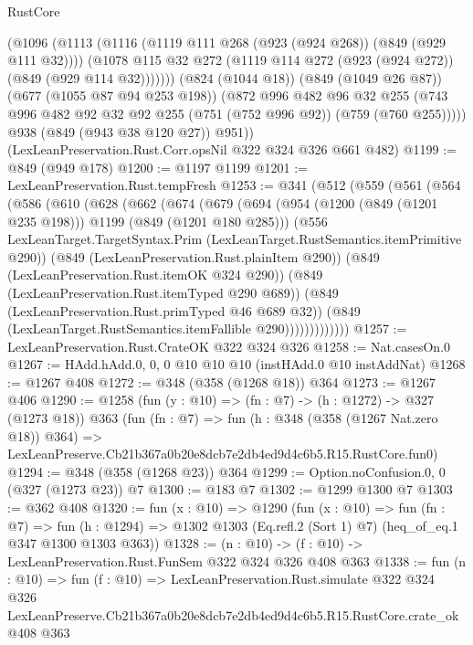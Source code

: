 \begin{lexlean}{RustCore}
\begin{coremodule}
            (@1096
              (@1113
                (@1116 (@1119 @111 @268 (@923 (@924 @268)) (@849 (@929 @111 @32))))
                (@1078 @115 @32 @272 (@1119 @114 @272 (@923 (@924 @272)) (@849 (@929 @114 @32)))))))
          (@824 (@1044 @18))
          (@849 (@1049 @26 @87))
          (@677 (@1055 @87 @94 @253 @198))
          (@872
            @996
            @482
            @96
            @32
            @255
            (@743 @996 @482 @92 @32 @92 @255 (@751 (@752 @996 @92)) (@759 (@760 @255)))))
        @938
        (@849 (@943 @38 @120 @27))
        @951))
    (LexLeanPreservation.Rust.Corr.opsNil @322 @324 @326 @661 @482)
@1199 := @849 (@949 @178)
@1200 := @1197 @1199
@1201 := LexLeanPreservation.Rust.tempFresh
@1253 := @341
    (@512
      (@559
        (@561
          (@564
            (@586
              (@610
                (@628
                  (@662
                    (@674
                      (@679
                        (@694
                          (@954 (@1200 (@849 (@1201 @235 @198))) @1199 (@849 (@1201 @180 @285)))
                          (@556
                            LexLeanTarget.TargetSyntax.Prim
                            (LexLeanTarget.RustSemantics.itemPrimitive @290))
                          (@849 (LexLeanPreservation.Rust.plainItem @290))
                          (@849 (LexLeanPreservation.Rust.itemOK @324 @290))
                          (@849 (LexLeanPreservation.Rust.itemTyped @290 @689))
                          (@849 (LexLeanPreservation.Rust.primTyped @46 @689 @32))
                          (@849 (LexLeanTarget.RustSemantics.itemFallible @290)))))))))))))
@1257 := LexLeanPreservation.Rust.CrateOK @322 @324 @326
@1258 := Nat.casesOn.{0}
@1267 := HAdd.hAdd.{0, 0, 0} @10 @10 @10 (instHAdd.{0} @10 instAddNat)
@1268 := @1267 @408
@1272 := @348 (@358 (@1268 @18)) @364
@1273 := @1267 @406
@1290 := @1258
    (fun (y : @10) => (fn : @7) -> (h : @1272) -> @327 (@1273 @18))
    @363
    (fun (fn : @7) =>
    fun (h : @348 (@358 (@1267 Nat.zero @18)) @364) =>
    LexLeanPreserve.Cb21b367a0b20e8dcb7e2db4ed9d4c6b5.R15.RustCore.fun0)
@1294 := @348 (@358 (@1268 @23)) @364
@1299 := Option.noConfusion.{0, 0} (@327 (@1273 @23)) @7
@1300 := @183 @7
@1302 := @1299 @1300 @7
@1303 := @362 @408
@1320 := fun (x : @10) =>
  @1290
    (fun (x : @10) =>
    fun (fn : @7) =>
    fun (h : @1294) => @1302 @1303 (Eq.refl.{2} (Sort 1) @7) (heq_of_eq.{1} @347 @1300 @1303 @363))
@1328 := (n : @10) -> (f : @10) -> LexLeanPreservation.Rust.FunSem @322 @324 @326 @408 @363
@1338 := fun (n : @10) =>
  fun (f : @10) =>
  LexLeanPreservation.Rust.simulate
    @322
    @324
    @326
    LexLeanPreserve.Cb21b367a0b20e8dcb7e2db4ed9d4c6b5.R15.RustCore.crate_ok
    @408
    @363
\end{coremodule}
\end{lexlean}
